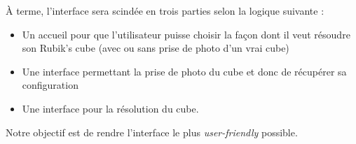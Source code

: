 À terme, l'interface sera scindée en trois parties selon la logique suivante :

\begin{itemize}
    \item Un accueil pour que l'utilisateur puisse choisir la façon dont il veut résoudre son Rubik's cube (avec ou sans prise de photo d'un vrai cube)
    \item Une interface permettant la prise de photo du cube et donc de récupérer sa configuration 
    \item Une interface pour la résolution du cube.
\end{itemize}
Notre objectif est de rendre l'interface le plus \textit{user-friendly} possible.


